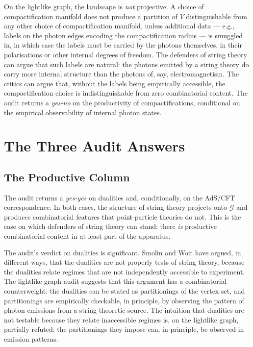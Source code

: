 \documentclass[11pt]{article}
\begin{document}
On the lightlike graph, the landscape is \emph{not} projective. A choice of compactification manifold does not produce a partition of $V$ distinguishable from any other choice of compactification manifold, unless additional data --- e.g., labels on the photon edges encoding the compactification radius --- is smuggled in, in which case the labels must be carried by the photons themselves, in their polarisations or other internal degrees of freedom. The defenders of string theory can argue that such labels are natural: the photons emitted by a string theory do carry more internal structure than the photons of, say, electromagnetism. The critics can argue that, without the labels being empirically accessible, the compactification choice is indistinguishable from zero combinatorial content. The audit returns a \emph{yes-no} on the productivity of compactifications, conditional on the empirical observability of internal photon states.

\section{The Three Audit Answers}

\subsection{The Productive Column}

The audit returns a \emph{yes-yes} on dualities and, conditionally, on the AdS/CFT correspondence. In both cases, the structure of string theory projects onto $\mathcal{G}$ and produces combinatorial features that point-particle theories do not. This is the case on which defenders of string theory can stand: there \emph{is} productive combinatorial content in at least part of the apparatus.

The audit's verdict on dualities is significant. Smolin and Woit have argued, in different ways, that the dualities are not properly tests of string theory, because the dualities relate regimes that are not independently accessible to experiment. The lightlike-graph audit suggests that this argument has a combinatorial counterweight: the dualities can be stated as partitionings of the vertex set, and partitionings are empirically checkable, in principle, by observing the pattern of photon emissions from a string-theoretic source. The intuition that dualities are not testable because they relate inaccessible regimes is, on the lightlike graph, partially refuted: the partitionings they impose can, in principle, be observed in emission patterns.
\end{document}
